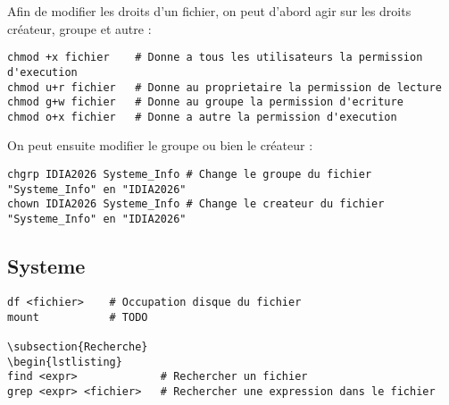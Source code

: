 \documentclass{article}
\begin{document}
Afin de modifier les droits d'un fichier, on peut d'abord agir sur les droits créateur, groupe et autre :

\begin{lstlisting}
chmod +x fichier    # Donne a tous les utilisateurs la permission d'execution
chmod u+r fichier   # Donne au proprietaire la permission de lecture
chmod g+w fichier   # Donne au groupe la permission d'ecriture
chmod o+x fichier   # Donne a autre la permission d'execution
\end{lstlisting}

On peut ensuite modifier le groupe ou bien le créateur :

\begin{lstlisting}
chgrp IDIA2026 Systeme_Info # Change le groupe du fichier "Systeme_Info" en "IDIA2026"
chown IDIA2026 Systeme_Info # Change le createur du fichier "Systeme_Info" en "IDIA2026"
\end{lstlisting}

\subsection{Systeme}
\begin{lstlisting}
df <fichier>    # Occupation disque du fichier
mount           # TODO

\subsection{Recherche}
\begin{lstlisting}
find <expr>             # Rechercher un fichier
grep <expr> <fichier>   # Rechercher une expression dans le fichier
\end{lstlisting}
\end{document}
